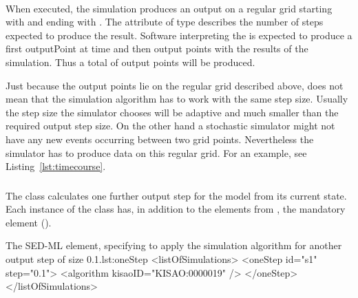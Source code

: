 \paragraph*{}
\label{sec:numberOfSteps}
When executed, the \hyperref[class:uniformTimeCourse]{} simulation produces an output on a regular grid starting with \hyperref[sec:outputStartTime]{} and ending with \hyperref[sec:outputEndTime]{}. The attribute  of type  describes the number of steps expected to produce the result. Software interpreting the \hyperref[class:uniformTimeCourse]{} is expected to produce a first outputPoint at time \hyperref[sec:outputStartTime]{} and then  output points with the results of the simulation. Thus a total of  output points will be produced.

Just because the output points lie on the regular grid described above, does not mean that the simulation algorithm has to work with the same step size. Usually the step size the simulator chooses will be adaptive and much smaller than the required output step size. On the other hand a stochastic simulator might not have any new events occurring between two grid points. Nevertheless the simulator has to produce data on this regular grid. For an example, see Listing~\ref{lst:timecourse}.



\subsubsection{}
\label{class:oneStep}

The  class calculates one further output step for the model from its current state. Each instance of the  class has, in addition to the elements from \Simulation, the mandatory element \hyperref[sec:step]{} ().


\begin{myXmlLst}{The SED-ML  element, specifying to apply the simulation algorithm for another output step of size 0.1.}{lst:oneStep}
<listOfSimulations> 
	<oneStep id="s1" step="0.1"> 
		<algorithm kisaoID="KISAO:0000019" />
	</oneStep> 
</listOfSimulations>
\end{myXmlLst}

